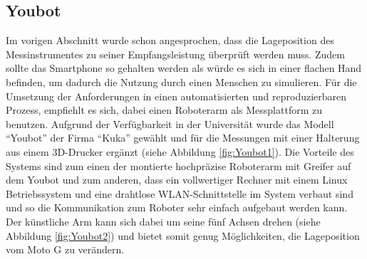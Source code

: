 \subsection{Youbot}\label{sec:You}
Im vorigen Abschnitt wurde schon angesprochen, dass die Lageposition des Messinstrumentes zu seiner Empfangsleistung überprüft werden muss. Zudem sollte das Smartphone so gehalten werden als würde es sich in einer flachen Hand befinden, um dadurch die Nutzung durch einen Menschen zu simulieren. Für die Umsetzung der Anforderungen in einen automatisierten und reproduzierbaren Prozess, empfiehlt es sich, dabei einen Roboterarm als Messplattform zu benutzen. Aufgrund der Verfügbarkeit in der Universität wurde das Modell "`Youbot"' der Firma "`Kuka"' gewählt und für die Messungen mit einer Halterung aus einem 3D-Drucker ergänzt (siehe Abbildung \ref{fig:Youbot1}). Die Vorteile des Systems sind zum einen der montierte hochpräzise Roboterarm mit Greifer auf dem Youbot und zum anderen, dass ein vollwertiger Rechner mit einem Linux Betriebssystem und eine drahtlose WLAN-Schnittstelle im System verbaut sind und so die Kommunikation zum Roboter sehr einfach aufgebaut werden kann. Der künstliche Arm kann sich dabei um seine fünf Achsen drehen (siehe Abbildung \ref{fig:Youbot2}) und bietet somit genug Möglichkeiten, die Lageposition vom Moto G zu verändern. 
